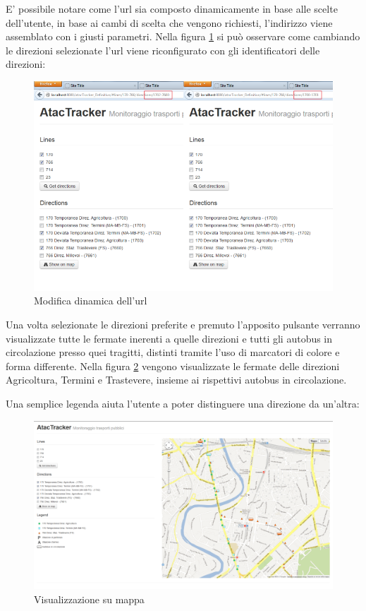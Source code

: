 E' possibile notare come l'url sia composto dinamicamente in base alle scelte dell'utente, in base ai cambi di scelta che vengono richiesti, l'indirizzo viene assemblato con i giusti parametri. Nella figura \ref{fig:indirizzo} si può osservare come cambiando le direzioni selezionate l'url viene riconfigurato con gli identificatori delle direzioni:

\begin{figure}[htbp]
\begin{center}
\includegraphics[width=12cm]{contents/images/indirizzo}
\end{center}
\caption{Modifica dinamica dell'url}
\label{fig:indirizzo}
\end{figure}
\newpage
Una volta selezionate le direzioni preferite e premuto l'apposito pulsante verranno visualizzate tutte le fermate inerenti a quelle direzioni e tutti gli autobus in circolazione presso quei tragitti, distinti tramite l'uso di marcatori di colore e forma differente. Nella figura \ref{fig:bus} vengono visualizzate le fermate delle direzioni Agricoltura, Termini e Trastevere, insieme ai rispettivi autobus in circolazione.

Una semplice legenda aiuta l'utente a poter distinguere una direzione da un'altra:

\begin{figure}[htbp]
\begin{center}
\includegraphics[width=12cm]{contents/images/bus}
\end{center}
\caption{Visualizzazione su mappa}
\label{fig:bus}
\end{figure}


